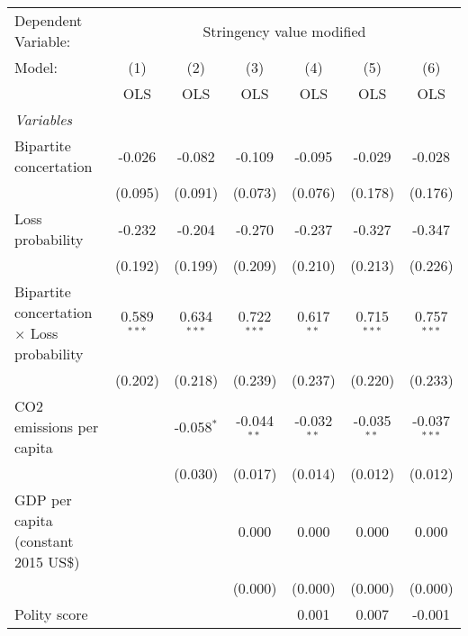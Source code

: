 
\begingroup
\centering
\begin{tabular}{lcccccc}
   \toprule
   Dependent Variable: & \multicolumn{6}{c}{Stringency value modified}\\
   Model:                                            & (1)           & (2)           & (3)           & (4)           & (5)           & (6)\\  
                                                     &  OLS          & OLS           & OLS           & OLS           & OLS           & OLS\\  
   \midrule
   \emph{Variables}\\
   Bipartite concertation                            & -0.026        & -0.082        & -0.109        & -0.095        & -0.029        & -0.028\\   
                                                     & (0.095)       & (0.091)       & (0.073)       & (0.076)       & (0.178)       & (0.176)\\   
   Loss probability                                  & -0.232        & -0.204        & -0.270        & -0.237        & -0.327        & -0.347\\   
                                                     & (0.192)       & (0.199)       & (0.209)       & (0.210)       & (0.213)       & (0.226)\\   
   Bipartite concertation $\times$ Loss probability  & 0.589$^{***}$ & 0.634$^{***}$ & 0.722$^{***}$ & 0.617$^{**}$  & 0.715$^{***}$ & 0.757$^{***}$\\   
                                                     & (0.202)       & (0.218)       & (0.239)       & (0.237)       & (0.220)       & (0.233)\\   
   CO2 emissions per capita                          &               & -0.058$^{*}$  & -0.044$^{**}$ & -0.032$^{**}$ & -0.035$^{**}$ & -0.037$^{***}$\\   
                                                     &               & (0.030)       & (0.017)       & (0.014)       & (0.012)       & (0.012)\\   
   GDP per capita (constant 2015 US\$)               &               &               & 0.000         & 0.000         & 0.000         & 0.000\\   
                                                     &               &               & (0.000)       & (0.000)       & (0.000)       & (0.000)\\   
   Polity score                                      &               &               &               & 0.001         & 0.007         & -0.001\\   

\end{tabular}
